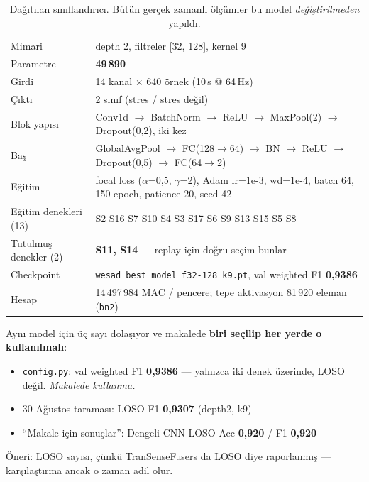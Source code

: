 \documentclass[11pt,a4paper]{report}
\newcommand{\kod}[1]{\texttt{\small #1}}
\newcommand{\dosya}[1]{\texttt{\footnotesize #1}}
\begin{document}
\begin{table}[H]
\centering\small
\begin{tabular}{@{}lp{9.8cm}@{}}
\toprule
Mimari & depth 2, filtreler [32, 128], kernel 9 \\
Parametre & \textbf{49\,890} \\
Girdi & 14 kanal $\times$ 640 örnek (10\,s @ 64\,Hz) \\
Çıktı & 2 sınıf (stres / stres değil) \\
Blok yapısı & Conv1d $\rightarrow$ BatchNorm $\rightarrow$ ReLU $\rightarrow$ MaxPool(2) $\rightarrow$ Dropout(0{,}2), iki kez \\
Baş & GlobalAvgPool $\rightarrow$ FC(128$\rightarrow$64) $\rightarrow$ BN $\rightarrow$ ReLU $\rightarrow$ Dropout(0{,}5) $\rightarrow$ FC(64$\rightarrow$2) \\
Eğitim & focal loss ($\alpha$=0{,}5, $\gamma$=2), Adam lr=1e-3, wd=1e-4, batch 64, 150 epoch, patience 20, seed 42 \\
Eğitim denekleri (13) & S2 S16 S7 S10 S4 S3 S17 S6 S9 S13 S15 S5 S8 \\
Tutulmuş denekler (2) & \textbf{S11, S14} --- replay için doğru seçim bunlar \\
Checkpoint & \dosya{wesad\_best\_model\_f32-128\_k9.pt}, val weighted F1 \textbf{0{,}9386} \\
Hesap & 14\,497\,984 MAC / pencere; tepe aktivasyon 81\,920 eleman (\kod{bn2}) \\
\bottomrule
\end{tabular}
\caption{Dağıtılan sınıflandırıcı. Bütün gerçek zamanlı ölçümler bu model
\emph{değiştirilmeden} yapıldı.}
\end{table}

\begin{uyari}
Aynı model için üç sayı dolaşıyor ve makalede \textbf{biri seçilip her yerde o
kullanılmalı}:
\begin{itemize}[nosep,leftmargin=1.4em]
\item \kod{config.py}: val weighted F1 \textbf{0{,}9386} --- yalnızca iki denek
üzerinde, LOSO değil. \emph{Makalede kullanma.}
\item 30 Ağustos taraması: LOSO F1 \textbf{0{,}9307} (depth2, k9)
\item ``Makale için sonuçlar'': Dengeli CNN LOSO Acc \textbf{0{,}920} / F1 \textbf{0{,}920}
\end{itemize}
Öneri: LOSO sayısı, çünkü TranSenseFusers da LOSO diye raporlanmış ---
karşılaştırma ancak o zaman adil olur.
\end{uyari}
\end{document}
